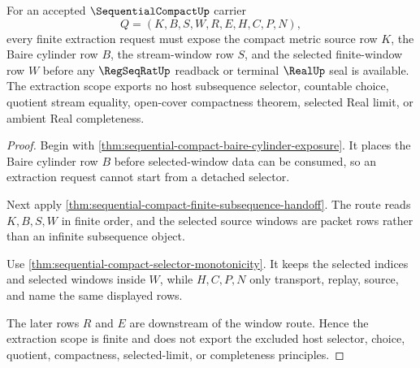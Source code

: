 \begin{theorem}
\label{thm:sequential-compact-window-extraction-scope}
For an accepted $\SequentialCompactUp$ carrier
$$
Q=(K,B,S,W,R,E,H,C,P,N),
$$
every finite extraction request must expose the compact metric source row $K$, the Baire cylinder row $B$, the stream-window row $S$, and the selected finite-window row $W$ before any $\RegSeqRatUp$ readback or terminal $\RealUp$ seal is available. The extraction scope exports no host subsequence selector, countable choice, quotient stream equality, open-cover compactness theorem, selected Real limit, or ambient Real completeness.
\end{theorem}
\begin{proof}
Begin with \autoref{thm:sequential-compact-baire-cylinder-exposure}. It places the Baire cylinder row $B$ before selected-window data can be consumed, so an extraction request cannot start from a detached selector.

Next apply \autoref{thm:sequential-compact-finite-subsequence-handoff}. The route reads $K,B,S,W$ in finite order, and the selected source windows are packet rows rather than an infinite subsequence object.

Use \autoref{thm:sequential-compact-selector-monotonicity}. It keeps the selected indices and selected windows inside $W$, while $H,C,P,N$ only transport, replay, source, and name the same displayed rows.

The later rows $R$ and $E$ are downstream of the window route. Hence the extraction scope is finite and does not export the excluded host selector, choice, quotient, compactness, selected-limit, or completeness principles.
\end{proof}

